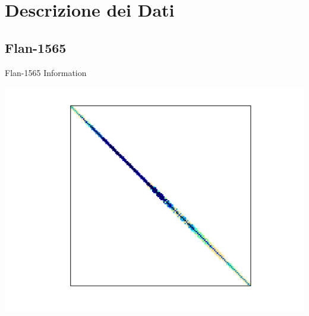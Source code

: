\section{Descrizione dei Dati} %


\subsection{Flan-1565}
\begin{table}[h!]
	\begin{minipage}{0.5\linewidth}
		\caption{Flan-1565 Information}
		\label{table:Flan-1565}
		\centering
        
	\end{minipage}\hfill
	\begin{minipage}{0.45\linewidth}
		\centering
		\includegraphics[width=1\textwidth]{figs/Flan_1565.png}
		\label{fig:Flan-1565}
	\end{minipage}
\end{table}


